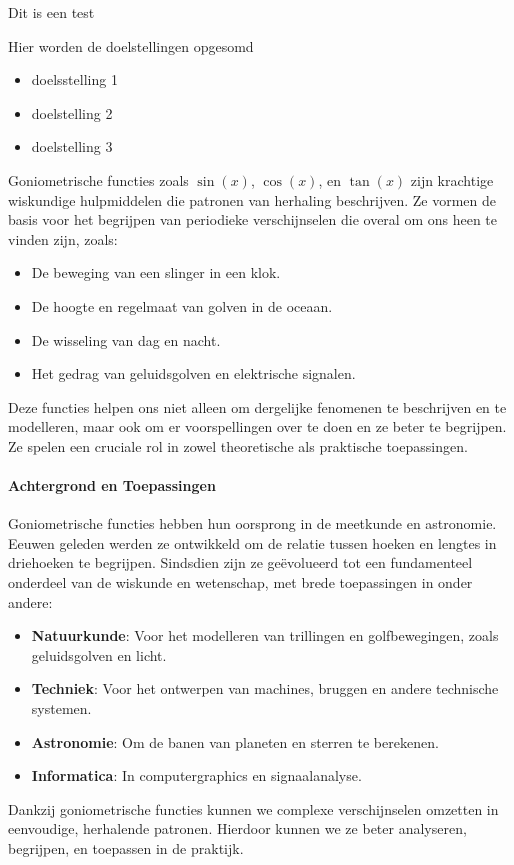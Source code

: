 \documentclass{ximera}
\begin{document}
\begin{template*}
   Dit is een test 
\end{template*}
    



\begin{template}
Hier worden de doelstellingen opgesomd
\begin{itemize}
    \item doelsstelling 1
    \item doelstelling 2
    \item doelstelling 3
\end{itemize}
\end{template}


Goniometrische functies zoals \(\sin(x)\), \(\cos(x)\), en \(\tan(x)\) zijn krachtige wiskundige hulpmiddelen die patronen van herhaling beschrijven. Ze vormen de basis voor het begrijpen van periodieke verschijnselen die overal om ons heen te vinden zijn, zoals:
\begin{itemize}
    \item De beweging van een slinger in een klok.
    \item De hoogte en regelmaat van golven in de oceaan.
    \item De wisseling van dag en nacht.
    \item Het gedrag van geluidsgolven en elektrische signalen.
\end{itemize}
Deze functies helpen ons niet alleen om dergelijke fenomenen te beschrijven en te modelleren, maar ook om er voorspellingen over te doen en ze beter te begrijpen. Ze spelen een cruciale rol in zowel theoretische als praktische toepassingen.

\paragraph*{Achtergrond en Toepassingen} 
Goniometrische functies hebben hun oorsprong in de meetkunde en astronomie. Eeuwen geleden werden ze ontwikkeld om de relatie tussen hoeken en lengtes in driehoeken te begrijpen. Sindsdien zijn ze geëvolueerd tot een fundamenteel onderdeel van de wiskunde en wetenschap, met brede toepassingen in onder andere:

\begin{itemize}
    \item \textbf{Natuurkunde}: Voor het modelleren van trillingen en golfbewegingen, zoals geluidsgolven en licht.
    \item \textbf{Techniek}: Voor het ontwerpen van machines, bruggen en andere technische systemen.
    \item \textbf{Astronomie}: Om de banen van planeten en sterren te berekenen.
    \item \textbf{Informatica}: In computergraphics en signaalanalyse.
\end{itemize}

Dankzij goniometrische functies kunnen we complexe verschijnselen omzetten in eenvoudige, herhalende patronen. Hierdoor kunnen we ze beter analyseren, begrijpen, en toepassen in de praktijk.
\end{document}
